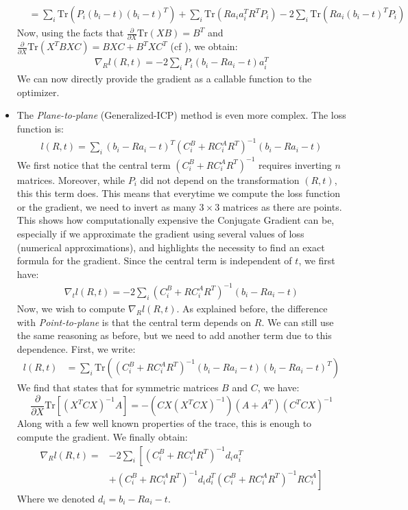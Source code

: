 \documentclass[11pt,letterpaper,leqno]{article}
\begin{document}
\begin{itemize}
\begin{align*}
        &= \sum_i \text{Tr}\left(P_i (b_i - t)(b_i - t)^T \right) +\sum_i \text{Tr}\left(R a_i a_i^T R^T P_i\right) - 2\sum_i \text{Tr}\left(R a_i(b_i-t)^T P_i\right)
    \end{align*}
    Now, using the facts that $\frac{\partial}{\partial X} \text{Tr}(XB) = B^T$ and $\frac{\partial}{\partial X} \text{Tr}(X^TBXC) = BXC + B^TXC^T$ (cf \cite{cookbook}), we obtain:
    \begin{align}
        \nabla_R l(R,t) = - 2 \sum_i P_i (b_i - R a_i -t) a_i^T \label{eq:grad_point2plane}
    \end{align}
    We can now directly provide the gradient as a callable function to the optimizer.
    \item The \textit{Plane-to-plane} (Generalized-ICP) method is even more complex. The loss function is:
    \begin{align*}
        l(R,t) = \sum_i (b_i - Ra_i - t)^T \left(C_i^B + R C_i^A R^T\right)^{-1} (b_i - Ra_i - t)
    \end{align*}
    We first notice that the central term $\left(C_i^B + R C_i^A R^T\right)^{-1}$ requires inverting $n$ matrices. Moreover, while $P_i$ did not depend on the transformation $(R,t)$, this this term does. This means that everytime we compute the loss function or the gradient, we need to invert as many $3\times 3$ matrices as there are points. This shows how computationally expensive the Conjugate Gradient can be, especially if we approximate the gradient using several values of loss (numerical approximations), and highlights the necessity to find an exact formula for the gradient. Since the central term is independent of $t$, we first have: 
    \begin{align}
        \nabla_t l(R,t) = - 2 \sum_i \left(C_i^B + R C_i^A R^T\right)^{-1} (b_i - R a_i -t)
    \end{align}
    Now, we wish to compute $\nabla_R l(R,t)$. As explained before, the difference with \textit{Point-to-plane} is that the central term depends on $R$. We can still use the same reasoning as before, but we need to add another term due to this dependence. First, we write:
    \begin{align*}
        l(R,t) &= \sum_i \text{Tr}\left(\left(C_i^B + R C_i^A R^T\right)^{-1} (b_i - R a_i - t) (b_i - R a_i - t)^T\right)
    \end{align*}
    We find that \cite{cookbook} states that for symmetric matrices $B$ and $C$, we have: $$\frac{\partial}{\partial X} \text{Tr}\left[(X^TCX)^{-1} A\right] = -(CX(X^TCX)^{-1})(A+A^T)(C^TCX)^{-1}$$
    Along with a few well known properties of the trace, this is enough to compute the gradient. We finally obtain:
    \begin{align}
        \nabla_R l(R,t) =& - 2 \sum_i \left[ \left(C_i^B + R C_i^A R^T\right)^{-1} d_i a_i^T \right. \label{eq:grad_generalizedicp}\\ &+\left. \left(C_i^B + R C_i^A R^T\right)^{-1} d_i d_i^T \left(C_i^B + R C_i^A R^T\right)^{-1} R C_i^A\right] \nonumber
    \end{align}
    Where we denoted $d_i = b_i - R a_i - t$.
\end{itemize}
\end{document}
